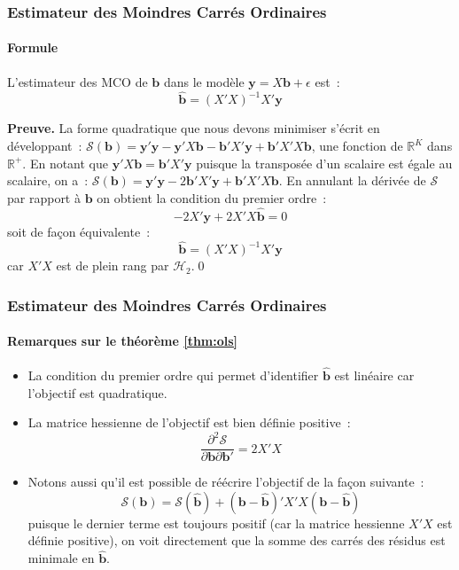 \documentclass[10pt]{beamer}
\theoremstyle{plain}
\begin{document}
\begin{frame}
  \frametitle{Estimateur des Moindres Carrés Ordinaires}
  \framesubtitle{Formule}

\begin{theorem}\label{thm:ols}
  L'estimateur des MCO de $\mathbf b$ dans le modèle $\mathbf y=X\mathbf b + \epsilon$ est~:
  \[
    \hat{\mathbf{b}} = \left( X'X \right)^{-1}X'\mathbf y
  \]
\end{theorem}


\bigskip

\textbf{Preuve.} \small{La forme quadratique que nous devons minimiser s'écrit en développant~: $\mathcal S(\mathbf b) = \mathbf y'\mathbf y-\mathbf y'X\mathbf b-\mathbf b'X'\mathbf y+\mathbf b'X'X\mathbf b$, une fonction de $\mathbb R^K$ dans $\mathbb R^+$. En notant que $\mathbf y'X\mathbf b = \mathbf b'X'\mathbf y$ puisque la transposée d'un scalaire est égale au scalaire, on a~: $\mathcal S(\mathbf b) = \mathbf y'\mathbf y-2\mathbf b'X'\mathbf y+\mathbf b'X'X\mathbf b$. En annulant la dérivée de $\mathcal S$ par rapport à $\mathbf b$ on obtient la condition du premier ordre~:
\[
-2X'\mathbf y + 2 X'X \hat{\mathbf b} = 0
\]
soit de façon équivalente~:
\[
\hat{\mathbf{b}} = \left( X'X \right)^{-1}X'\mathbf y
\]
car $X'X$ est de plein rang par $\mathcal H_2$.}\qed
\end{frame}


\begin{frame}
  \frametitle{Estimateur des Moindres Carrés Ordinaires}
  \framesubtitle{Remarques sur le théorème \ref{thm:ols}}

  \begin{itemize}

  \item La condition du premier ordre qui permet d'identifier $\hat{\mathbf b}$ est linéaire car l'objectif est quadratique.\newline

  \item La matrice hessienne de l'objectif est bien définie positive~:
    \[
      \frac{\partial^2\mathcal S}{\partial \mathbf b \partial\mathbf b'} = 2 X'X
    \]

  \item Notons aussi qu'il est possible de réécrire l'objectif de la façon suivante~:
    \[
      \mathcal S(\mathbf b) = \mathcal S(\hat{\mathbf b}) + \left(\mathbf b - \hat{\mathbf b}  \right)' X'X \left(\mathbf b - \hat{\mathbf b}  \right)
    \]
    puisque le dernier terme est toujours positif (car la matrice hessienne $X'X$ est définie positive), on voit directement que la somme des carrés des résidus est minimale en $\hat{\mathbf b}$.

  \end{itemize}

\end{frame}
\end{document}
